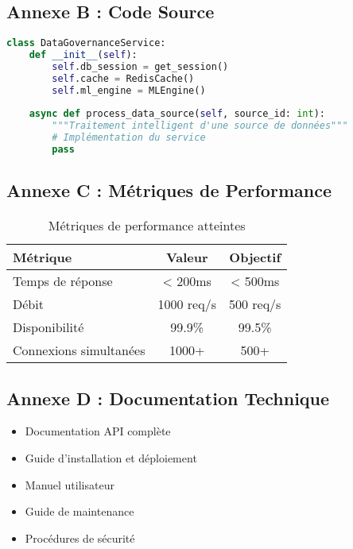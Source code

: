\documentclass[12pt,a4paper]{article}
\begin{document}
\subsection{Annexe B : Code Source}

\begin{lstlisting}[language=Python, caption=Exemple de service principal]
class DataGovernanceService:
    def __init__(self):
        self.db_session = get_session()
        self.cache = RedisCache()
        self.ml_engine = MLEngine()
    
    async def process_data_source(self, source_id: int):
        """Traitement intelligent d'une source de données"""
        # Implémentation du service
        pass
\end{lstlisting}

\subsection{Annexe C : Métriques de Performance}

\begin{table}[H]
\centering
\begin{tabular}{|l|c|c|}
\hline
\textbf{Métrique} & \textbf{Valeur} & \textbf{Objectif} \\
\hline
Temps de réponse & < 200ms & < 500ms \\
Débit & 1000 req/s & 500 req/s \\
Disponibilité & 99.9\% & 99.5\% \\
Connexions simultanées & 1000+ & 500+ \\
\hline
\end{tabular}
\caption{Métriques de performance atteintes}
\end{table}

\subsection{Annexe D : Documentation Technique}

\begin{itemize}
    \item Documentation API complète
    \item Guide d'installation et déploiement
    \item Manuel utilisateur
    \item Guide de maintenance
    \item Procédures de sécurité
\end{itemize}
\end{document}
